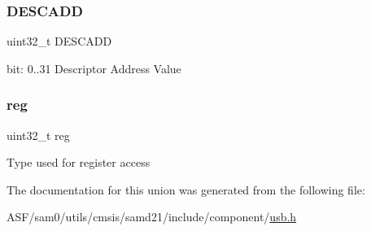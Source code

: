 \subsubsection{\texorpdfstring{DESCADD}{DESCADD}}
{\footnotesize\ttfamily uint32\+\_\+t D\+E\+S\+C\+A\+DD}

bit\+: 0..31 Descriptor Address Value \mbox{\label{union_u_s_b___d_e_s_c_a_d_d___type_a6b91636401516a477989a336376d7b40}} 
\subsubsection{\texorpdfstring{reg}{reg}}
{\footnotesize\ttfamily uint32\+\_\+t reg}

Type used for register access 

The documentation for this union was generated from the following file\+:\begin{DoxyCompactItemize}
\item 
A\+S\+F/sam0/utils/cmsis/samd21/include/component/\mbox{\hyperlink{component_2usb_8h}{usb.\+h}}\end{DoxyCompactItemize}

